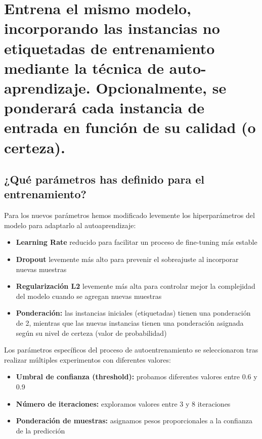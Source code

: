 \documentclass{article}
\begin{document}
\newpage
\section{Entrena el mismo modelo, incorporando las instancias no etiquetadas de entrenamiento mediante la técnica de auto-aprendizaje. Opcionalmente, se ponderará cada instancia de entrada en función de su calidad (o certeza).}

\subsection{¿Qué parámetros has definido para el entrenamiento?}
Para los nuevos parámetros hemos modificado levemente los hiperparámetros del modelo para adaptarlo al autoaprendizaje:
\begin{itemize}
    \item \textbf{Learning Rate} reducido para facilitar un proceso de fine-tuning más estable
    \item \textbf{Dropout} levemente más alto para prevenir el sobreajuste al incorporar nuevas muestras
    \item \textbf{Regularización L2} levemente más alta para controlar mejor la complejidad del modelo cuando se agregan nuevas muestras
    \item \textbf{Ponderación:} las instancias iniciales (etiquetadas) tienen una ponderación de 2, mientras que las nuevas instancias tienen una ponderación asignada según su nivel de certeza (valor de probabilidad)
\end{itemize}

Los parámetros específicos del proceso de autoentrenamiento se seleccionaron tras realizar múltiples experimentos con diferentes valores:
\begin{itemize}
    \item \textbf{Umbral de confianza (threshold):} probamos diferentes valores entre 0.6 y 0.9
    \item \textbf{Número de iteraciones:} exploramos valores entre 3 y 8 iteraciones
    \item \textbf{Ponderación de muestras:} asignamos pesos proporcionales a la confianza de la predicción
\end{itemize}
\end{document}
